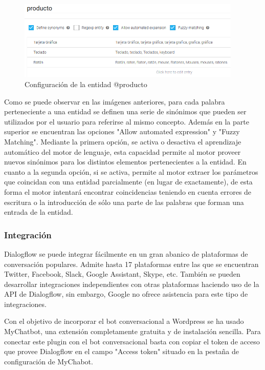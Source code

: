 \begin{itemize}
    \begin{figure}[ht]
    	\begin{center}
    		\includegraphics[width = 0.95\textwidth]{Figuras/entityProducto.PNG}
    	\end{center}
    	\caption{\label{fig:entidadProducto} Configuración de la entidad @producto}
    \end{figure}
\end{itemize}

Como se puede observar en las imágenes anteriores, para cada palabra perteneciente a una entidad se definen una serie de sinónimos que pueden ser utilizados por el usuario para referirse al mismo concepto. Además en la parte superior se encuentran las opciones "Allow automated expression" y "Fuzzy Matching". Mediante la primera opción, se activa o desactiva el aprendizaje automático del motor de lenguaje, esta capacidad permite al motor proveer nuevos sinónimos para los distintos elementos pertenecientes a la entidad. En cuanto a la segunda opción, si se activa, permite al motor extraer los parámetros que coincidan con una entidad parcialmente (en lugar de exactamente), de esta forma el motor intentará encontrar coincidencias teniendo en cuenta errores de escritura o la introducción de sólo una parte de las palabras que forman una entrada de la entidad. 

\newpage

\subsubsection{Integración}

Dialogflow se puede integrar fácilmente en un gran abanico de plataformas de conversación populares. Admite hasta 17 plataformas entre las que se encuentran Twitter, Facebook, Slack, Google Assistant, Skype, etc. También se pueden desarrollar integraciones independientes con otras plataformas haciendo uso de la API de Dialogflow, sin embargo, Google no ofrece asistencia para este tipo de integraciones.

Con el objetivo de incorporar el bot conversacional a Wordpress se ha usado MyChatbot, una extensión completamente gratuita y de instalación sencilla. Para conectar este plugin con el bot conversacional basta con copiar el token de acceso que provee Dialogflow en el campo "Access token" situado en la pestaña de configuración de MyChabot.

